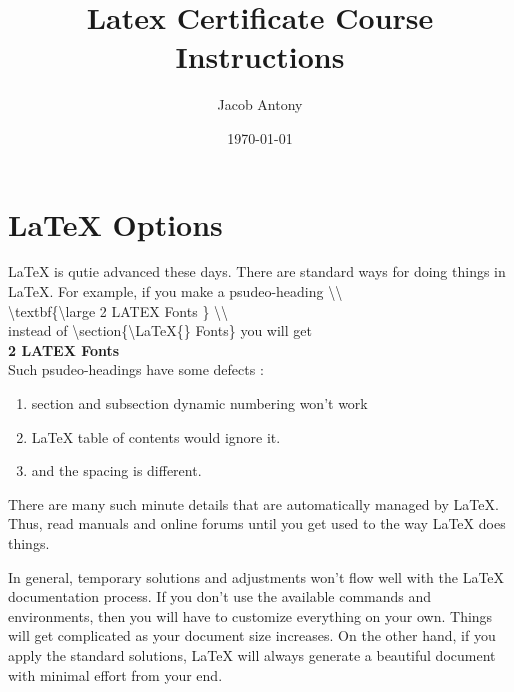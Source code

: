 \documentclass{article}
\title{Latex Certificate Course Instructions}
\author{Jacob Antony}
\date{\today}
\begin{document}
\maketitle

\section{\LaTeX{} Options}
\LaTeX{} is qutie advanced these days. There are standard ways for doing things in \LaTeX{}. For example, if you make a psudeo-heading \textbackslash\textbackslash\\

\textbackslash textbf\{\textbackslash large 2 LATEX Fonts \} \textbackslash \textbackslash\\

instead of \textbackslash section\{\textbackslash LaTeX\{\} Fonts\} you will get\\

\textbf{\Large 2 LATEX Fonts}\\

\normalsize
Such psudeo-headings have some defects :
\begin{enumerate}
	\item section and subsection dynamic numbering won't work
	\item \LaTeX{} table of contents would ignore it.
	\item and the spacing is different.
\end{enumerate}
There are many such minute details that are automatically managed by \LaTeX{}. Thus, read manuals and online forums until you get used to the way \LaTeX{} does things.

In general, temporary solutions and adjustments won't flow well with the \LaTeX{} documentation process. If you don't use the available commands and environments, then you will have to customize everything on your own. Things will get complicated as your document size increases. On the other hand, if you apply the standard solutions, \LaTeX{} will always generate a beautiful document with minimal effort from your end.
\end{document}
